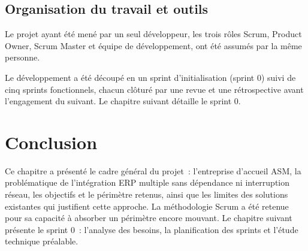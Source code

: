 \subsection{Organisation du travail et outils}

Le projet ayant été mené par un seul développeur, les trois rôles Scrum, Product Owner, Scrum
Master et équipe de développement, ont été assumés par la même personne.

Le développement a été découpé en un sprint d'initialisation (sprint 0) suivi de cinq sprints
fonctionnels, chacun clôturé par une revue et une rétrospective avant l'engagement du suivant. Le
chapitre suivant détaille le sprint 0.

\section{Conclusion}

Ce chapitre a présenté le cadre général du projet~: l'entreprise d'accueil ASM, la problématique de
l'intégration ERP multiple sans dépendance ni interruption réseau, les objectifs et le périmètre
retenus, ainsi que les limites des solutions existantes qui justifient cette approche. La
méthodologie Scrum a été retenue pour sa capacité à absorber un périmètre encore mouvant. Le
chapitre suivant présente le sprint 0~: l'analyse des besoins, la planification des sprints et
l'étude technique préalable.
